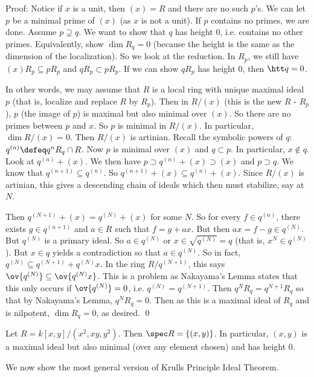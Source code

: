 \noindent Proof: Notice if $x$ is a unit, then $(x)=R$ and there are no such $p$'s. We can let $p$ be a minimal prime of $(x)$ (as $x$ is not a unit). If $p$ contains no primes, we are done. Assume $p \supsetneq q$. We want to show that $q$ has height 0, i.e. contains no other primes. Equivalently, show $\dim R_q=0$ (because the height is the same as the dimension of the localization). So we look at the reduction. In $R_p$, we still have $(x)R_p \subseteq pR_p$ and $qR_p \subset pR_p$. If we can show $qR_p$ has height 0, then $\htt q=0$. 

In other words, we may assume that $R$ is a local ring with unique maximal ideal $p$ (that is, localize and replace $R$ by $R_p$). Then in $R/(x)$ (this is the new $R$ - $R_p$), $p$ (the image of $p$) is maximal but also minimal over $(x)$. So there are no primes between $p$ and $x$. So $p$ is minimal in $R/(x)$. In particular, $\dim R/(x)=0$. Then $R/(x)$ is artinian. Recall the symbolic powers of $q$: $q^{(n)}\defeq q^nR_q \cap R$. Now $p$ is minimal over $(x)$ and $q \subset p$. In particular, $x \notin q$. Look at $q^{(n)}+(x)$. We then have $p \supset q^{(n)}+(x) \supset (x)$ and $p \supset q$. We know that $q^{(n+1)} \subseteq q^{(n)}$. So $q^{(n+1)}+(x) \subseteq q^{(n)}+(x)$. Since $R/(x)$ is artinian, this gives a descending chain of ideals which then must stabilize, say at $N$. 

Then $q^{(N+1)}+(x)=q^{(N)}+(x)$ for some $N$. So for every $f \in q^{(n)}$, there exists $g \in q^{(n+1)}$ and $a \in R$ such that $f=g+ax$. But then $ax=f-g \in q^{(N)}$. But $q^{(N)}$ is a primary ideal. So $a \in q^{(N)}$ or $x \in \sqrt{q^{(N)}}=q$ (that is, $x^N \in q^{(N)}$). But $x \in q$ yields a contradiction so that $a \in q^{(N)}$. So in fact, $q^{(N)} \subseteq q^{(N+1)}+q^{(N)}x$. In the ring $R/q^{(N+1)}$, this says $\ov{q^{(N)}} \subseteq \ov{q^{(N)}x}$. This is a problem as Nakayama's Lemma states that this only occurs if $\ov{q^{(N)}}=0$, i.e. $q^{(N)}=q^{(N+1)}$. Then $q^NR_q=q^{N+1}R_q$ so that by Nakayama's Lemma, $q^NR_q=0$. Then as this is a maximal ideal of $R_q$ and is nilpotent, $\dim R_q=0$, as desired. \qed \\

\begin{ex}
Let $R=k[x,y]/(x^2,xy,y^2)$. Then $\spec R=\{(x,y)\}$. In particular, $(x,y)$ is a maximal ideal but also minimal (over any element chosen) and has height 0.
\end{ex}

We now show the most general version of Krulls Principle Ideal Theorem. 

